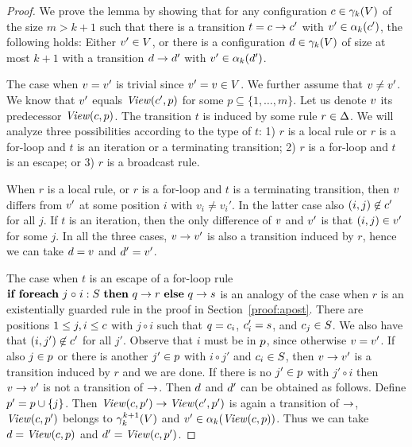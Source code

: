 \begin{proof}
%
We prove the lemma by showing that for any configuration $\conf\in\gammaof k(V)$ of the size $m > k+1$
%
such that there is a transition $t= \conf\trans\conf'$ with $\view'\in \projof {\conf'} k$, 
%
the following holds:
%
Either $\view'\in V$,
%
or there is a configuration $\confd\in\gammaof k(V)$ of size at most $k+1$
%
with a transition $\confd\trans\confd'$ with $\view'\in \projof {\confd'} k$. 

The case when $\view = \view'$ is trivial since $\view' = \view \in \X$.
%
We further assume that $\view \neq \view'$.
%
We know that $\view'$ equals $\Viewof {\conf'} p$ for some $p\subseteq\{1,\ldots,m\}$.
%
Let us denote $\view$ its predecessor $\Viewof {\conf} p$.
%
The transition $t$ is induced by some rule $r\in\rules$.
%
We will analyze three possibilities according to the type of $t$: 
%
1) $r$ is a local rule or $r$ is a for-loop and $t$ is an iteration or a terminating transition; 
%
2) $r$ is a for-loop and $t$ is an escape; or
%
3) $r$ is a broadcast rule.

When $r$ is a local rule, 
%
or $r$ is a for-loop and $t$ is a terminating transition, then  
%
$\view$ differs from $\view'$ at some position $i$ with $v_i \neq v_i'$. In the latter case also $(i,j)\not\in \conf'$ for all $j$.
%
If $t$ is an iteration, then the only difference of $\view$ and $\view'$ is that $(i,j)\in\view'$ for some $j$.
%
In all the three cases, $\view\trans\view'$ is also a transition induced by $r$, hence we can take $\confd=\view$ and $\confd'=\view'$. 

The case when $t$ is an escape of a for-loop rule $\forrule q r \circ S s$  
%
is an analogy of the case when $r$ is an existentially guarded rule in the proof in Section~\ref{proof:apost}.
%
There are positions $1\leq j,i \leq \conf$ with $j\circ i$ 
%
such that $q = \conf_i$, $\conf_i' = s$, and $\conf_j\in S$. 
%
We also have that $(i,j')\not\in\conf'$ for all $j'$.
%
Observe that $i$ must be in $\pos$, since otherwise $\view = \view'$.
%
If also $j\in\pos$ or there is another $j'\in \pos$ with $i\circ j'$ and $\conf_i\in S$, 
%
then $\view\trans\view'$ is a transition induced by $r$ and we are done.
%
If there is no $j'\in\pos$ with $j'\circ i$ then $\view\trans\view'$ is not a transition of $\trans$.
%
Then $\confd$ and $\confd'$ can be obtained as follows. 
%
Define $\pos' = \pos\cup\{j\}$. 
%
Then $\Viewof\conf {\pos'}\trans\Viewof{\conf'}{\pos'}$ is again a transition of $\trans$, 
%
$\Viewof \conf {\pos'}$ belongs to $\limgammaof k {k+1} (\X)$ and
%
$\view'\in \projof {\Viewof \conf {\pos}} k$.
%
Thus we can take $\confd=\Viewof \conf {\pos}$ and $\confd' = \Viewof \conf {\pos'}$. 


\end{proof}
